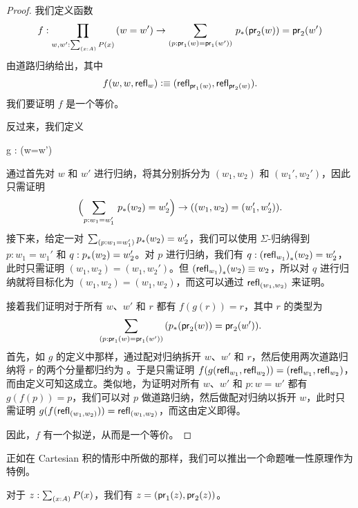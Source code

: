 \begin{proof}
我们定义函数
\begin{equation*}
f : \prd{w,w':\sm{x:A}P(x)} (w=w') \to \dsm{p:\proj{1}(w)=\proj{1}(w')} \trans{p}{\proj{2}(w)}=\proj{2}(w')
\end{equation*}
由道路归纳给出，其中
\begin{equation*}
f(w,w,\mathsf{refl}_{w})\vcentcolon\equiv(\mathsf{refl}_{\mathsf{pr}_{1}(w)},\mathsf{refl}_{\mathsf{pr}_{2}(w)}).
\end{equation*}
我们要证明 $f$ 是一个等价。

反过来，我们定义
\begin{narrowmultline*}
  g : 
      \to
      \narrowbreak
      (w=w')
\end{narrowmultline*}
通过首先对 $w$ 和 $w'$ 进行归纳，将其分别拆分为 $(w_1,w_2)$ 和
$(w_1',w_2')$，因此只需证明
\begin{equation*}
\Parens{\sm{p:w_1 = w_1'}\trans{p}{w_2}=w_2'} \to ((w_1,w_2)=(w_1',w_2')).
\end{equation*}
接下来，给定一对 $\sm{p:w_1 = w_1'}\trans{p}{w_2}=w_2'$，我们可以使用 $\Sigma$-归纳得到 $p : w_1 = w_1'$ 和 $q :
{p}_{*}\mathopen{}\left({w_2}\right)\mathclose{}=w_2'$。对 $p$ 进行归纳，我们有 $q :
{(\mathsf{refl}_{w_1})}_{*}\mathopen{}\left({w_2}\right)\mathclose{}=w_2'$，此时只需证明
$(w_1,w_2)=(w_1,w_2')$。但 ${(\mathsf{refl}_{w_1})}_{*}\mathopen{}\left({w_2}\right)\mathclose{} \equiv w_2$，所以对 $q$ 进行归纳就将目标化为
$(w_1,w_2)=(w_1,w_2)$，而这可以通过 $\mathsf{refl}_{(w_1,w_2)}$ 来证明。

接着我们证明对于所有 $w$、$w'$ 和 $r$ 都有 $f(g(r))=r$，其中 $r$ 的类型为
\[\dsm{p:\proj{1}(w)=\proj{1}(w')} (\trans{p}{\proj{2}(w)}=\proj{2}(w')).\]
首先，如 $g$ 的定义中那样，通过配对归纳拆开 $w$、$w'$ 和 $r$，然后使用两次道路归纳将 $r$ 的两个分量都归约为 。于是只需证明
$f (g(\mathsf{refl}_{w_1},\mathsf{refl}_{w_2})) = (\mathsf{refl}_{w_1},\mathsf{refl}_{w_2})$，而由定义可知这成立。类似地，为证明对所有 $w$、$w'$ 和 $p : w = w'$ 都有 $g(f(p))=p$，我们可以对 $p$ 做道路归纳，然后做配对归纳以拆开 $w$，此时只需证明
$g(f (\mathsf{refl}_{(w_1,w_2)})) = \mathsf{refl}_{(w_1,w_2)}$，而这由定义即得。

因此，$f$ 有一个拟逆，从而是一个等价。
\end{proof}

正如在 Cartesian 积的情形中所做的那样，我们可以推出一个命题唯一性原理作为特例。

\begin{cor}\label{thm:eta-sigma}
  对于 $z:\sm{x:A} P(x)$，我们有 $z = (\mathsf{pr}_{1}(z),\mathsf{pr}_{2}(z))$。
\end{cor}

